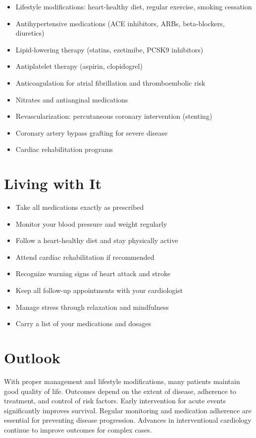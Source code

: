 \begin{itemize}[noitemsep]
  \item Lifestyle modifications: heart-healthy diet, regular exercise, smoking cessation
  \item Antihypertensive medications (ACE inhibitors, ARBs, beta-blockers, diuretics)
  \item Lipid-lowering therapy (statins, ezetimibe, PCSK9 inhibitors)
  \item Antiplatelet therapy (aspirin, clopidogrel)
  \item Anticoagulation for atrial fibrillation and thromboembolic risk
  \item Nitrates and antianginal medications
  \item Revascularization: percutaneous coronary intervention (stenting)
  \item Coronary artery bypass grafting for severe disease
  \item Cardiac rehabilitation programs
\end{itemize}
\section{Living with It}
\begin{itemize}[noitemsep]
  \item Take all medications exactly as prescribed
  \item Monitor your blood pressure and weight regularly
  \item Follow a heart-healthy diet and stay physically active
  \item Attend cardiac rehabilitation if recommended
  \item Recognize warning signs of heart attack and stroke
  \item Keep all follow-up appointments with your cardiologist
  \item Manage stress through relaxation and mindfulness
  \item Carry a list of your medications and dosages
\end{itemize}
\section{Outlook}
With proper management and lifestyle modifications, many patients maintain good quality of life. Outcomes depend on the extent of disease, adherence to treatment, and control of risk factors. Early intervention for acute events significantly improves survival. Regular monitoring and medication adherence are essential for preventing disease progression. Advances in interventional cardiology continue to improve outcomes for complex cases.
